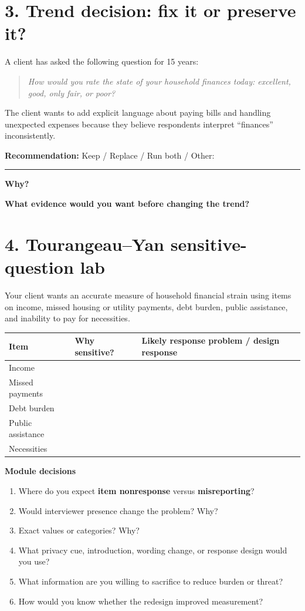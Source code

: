 \documentclass[11pt]{article}
\newcommand{\blank}[1]{\vspace{#1}}
\begin{document}
\section*{3. Trend decision: fix it or preserve it?}

A client has asked the following question for 15 years:

\begin{quote}
\emph{How would you rate the state of your household finances today: excellent, good, only fair, or poor?}
\end{quote}

The client wants to add explicit language about paying bills and handling unexpected expenses because they believe respondents interpret ``finances'' inconsistently.

\textbf{Recommendation:} Keep / Replace / Run both / Other: \rule{2.2in}{0.4pt}

\textbf{Why?}
\blank{0.75in}

\textbf{What evidence would you want before changing the trend?}
\blank{0.65in}

\newpage

\section*{4. Tourangeau--Yan sensitive-question lab}

Your client wants an accurate measure of household financial strain using items on income, missed housing or utility payments, debt burden, public assistance, and inability to pay for necessities.

\begin{tabularx}{\textwidth}{p{}p{}X}
\toprule
\textbf{Item} & \textbf{Why sensitive?} & \textbf{Likely response problem / design response} \\
\midrule
Income & & \\[0.55in]
Missed payments & & \\[0.55in]
Debt burden & & \\[0.55in]
Public assistance & & \\[0.55in]
Necessities & & \\[0.55in]
\bottomrule
\end{tabularx}

\medskip
\textbf{Module decisions}
\begin{enumerate}[leftmargin=*]
\item Where do you expect \textbf{item nonresponse} versus \textbf{misreporting}?
\blank{0.4in}
\item Would interviewer presence change the problem? Why?
\blank{0.4in}
\item Exact values or categories? Why?
\blank{0.4in}
\item What privacy cue, introduction, wording change, or response design would you use?
\blank{0.45in}
\item What information are you willing to sacrifice to reduce burden or threat?
\blank{0.4in}
\item How would you know whether the redesign improved measurement?
\blank{0.45in}
\end{enumerate}
\end{document}
